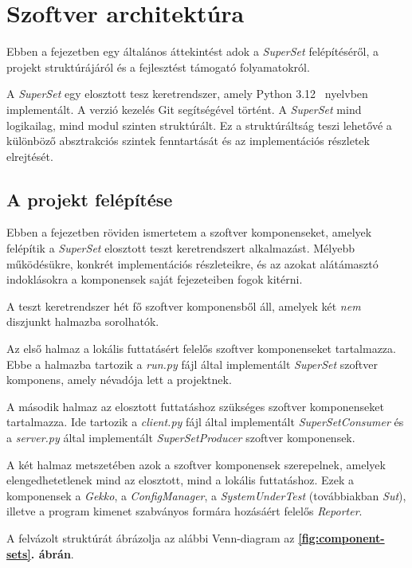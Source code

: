 \chapter{Szoftver architektúra}

Ebben a fejezetben egy általános áttekintést adok a \textit{SuperSet} felépítéséről, a projekt struktúrájáról és a
fejlesztést támogató folyamatokról.

A \textit{SuperSet} egy elosztott tesz keretrendszer, amely Python 3.12~\cite{python312} nyelvben implementált. A
verzió kezelés Git segítségével történt. A \textit{SuperSet} mind logikailag, mind modul szinten struktúrált. Ez a
struktúráltság teszi lehetővé a különböző absztrakciós szintek fenntartását és az implementációs részletek elrejtését.

\section{A projekt felépítése}\label{sec:project-structure}

    Ebben a fejezetben röviden ismertetem a szoftver komponenseket, amelyek felépítik a \textit{SuperSet} elosztott
    teszt keretrendszert alkalmazást. Mélyebb működésükre, konkrét implementációs részleteikre, és az azokat
    alátámasztó indoklásokra a komponensek saját fejezeteiben fogok kitérni.

    A teszt keretrendszer hét fő szoftver komponensből áll, amelyek két \emph{nem} diszjunkt halmazba sorolhatók.

    Az első halmaz a lokális futtatásért felelős szoftver komponenseket tartalmazza. Ebbe a halmazba tartozik a
    \textit{run.py} fájl által implementált \textit{SuperSet} szoftver komponens, amely névadója lett a projektnek.

    A második halmaz az elosztott futtatáshoz szükséges szoftver komponenseket tartalmazza. Ide tartozik a
    \textit{client.py} fájl által implementált \textit{SuperSetConsumer} és a \textit{server.py} által implementált
    \textit{SuperSetProducer} szoftver komponensek.

    A két halmaz metszetében azok a szoftver komponensek szerepelnek, amelyek elengedhetetlenek mind az elosztott, mind
    a lokális futtatáshoz. Ezek a komponensek a \textit{Gekko}, a \textit{ConfigManager}, a \textit{SystemUnderTest}
    (továbbiakban \textit{Sut}), illetve a program kimenet szabványos formára hozásáért felelős \textit{Reporter}.

    A felvázolt struktúrát ábrázolja az alábbi Venn-diagram az \textbf{\ref{fig:component-sets}. ábrán}. \pagebreak

